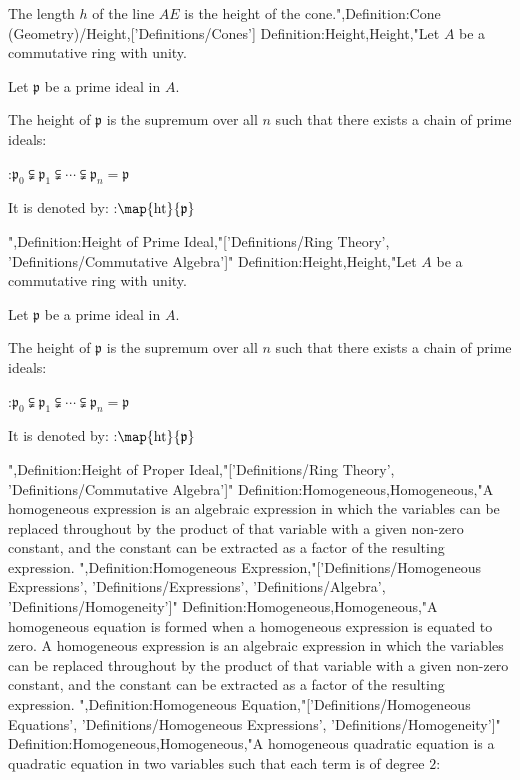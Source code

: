 The length $h$ of the line $AE$ is the height of the cone.",Definition:Cone (Geometry)/Height,['Definitions/Cones']
Definition:Height,Height,"Let $A$ be a commutative ring with unity.

Let $\mathfrak p$ be a prime ideal in $A$.


The height of $\mathfrak p$ is the supremum over all $n$ such that there exists a chain of prime ideals:

:$\mathfrak p_0 \subsetneqq \mathfrak p_1 \subsetneqq \cdots \subsetneqq \mathfrak p_n = \mathfrak p$


It is denoted by:
:$\map {\operatorname {ht} } {\mathfrak p}$

",Definition:Height of Prime Ideal,"['Definitions/Ring Theory', 'Definitions/Commutative Algebra']"
Definition:Height,Height,"Let $A$ be a commutative ring with unity.

Let $\mathfrak p$ be a prime ideal in $A$.


The height of $\mathfrak p$ is the supremum over all $n$ such that there exists a chain of prime ideals:

:$\mathfrak p_0 \subsetneqq \mathfrak p_1 \subsetneqq \cdots \subsetneqq \mathfrak p_n = \mathfrak p$


It is denoted by:
:$\map {\operatorname {ht} } {\mathfrak p}$


",Definition:Height of Proper Ideal,"['Definitions/Ring Theory', 'Definitions/Commutative Algebra']"
Definition:Homogeneous,Homogeneous,"A homogeneous expression is an algebraic expression in which the variables can be replaced throughout by the product of that variable with a given non-zero constant, and the constant can be extracted as a factor of the resulting expression.
",Definition:Homogeneous Expression,"['Definitions/Homogeneous Expressions', 'Definitions/Expressions', 'Definitions/Algebra', 'Definitions/Homogeneity']"
Definition:Homogeneous,Homogeneous,"A homogeneous equation is formed when a homogeneous expression is equated to zero.
A homogeneous expression is an algebraic expression in which the variables can be replaced throughout by the product of that variable with a given non-zero constant, and the constant can be extracted as a factor of the resulting expression.
",Definition:Homogeneous Equation,"['Definitions/Homogeneous Equations', 'Definitions/Homogeneous Expressions', 'Definitions/Homogeneity']"
Definition:Homogeneous,Homogeneous,"A homogeneous quadratic equation is a quadratic equation in two variables such that each term is of degree $2$:

